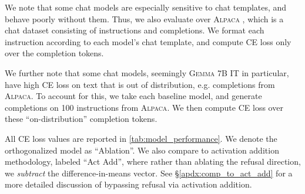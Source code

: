 \documentclass{article}
\begin{document}
We note that some chat models are especially sensitive to chat templates, and behave poorly without them.
Thus, we also evaluate over \textsc{Alpaca} \citep{alpaca}, which is a chat dataset consisting of instructions and completions.
We format each instruction according to each model's chat template, and compute CE loss only over the completion tokens.

We further note that some chat models, seemingly \textsc{Gemma 7B IT} in particular, have high CE loss on text that is out of distribution, e.g. completions from \textsc{Alpaca}.
To account for this, we take each baseline model, and generate completions on 100 instructions from \textsc{Alpaca}.
We then compute CE loss over these ``on-distribution'' completion tokens.

All CE loss values are reported in \autoref{tab:model_performance}.
We denote the orthogonalized model as ``Ablation''.
We also compare to activation addition methodology, labeled ``Act Add'', where rather than ablating the refusal direction, we \emph{subtract} the difference-in-means vector.
See \S\ref{apdx:comp_to_act_add} for a more detailed discussion of bypassing refusal via activation addition.
\end{document}
